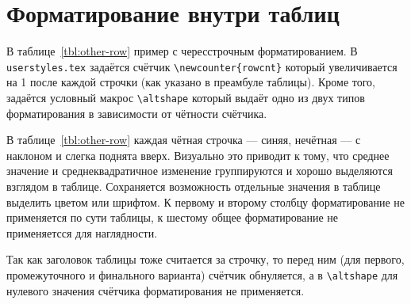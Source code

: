 \section{Форматирование внутри таблиц} \label{AppendixB3}

В таблице~\ref{tbl:other-row} пример с чересстрочным
форматированием. В \verb+userstyles.tex+  задаётся счётчик
\verb+\newcounter{rowcnt}+ который увеличивается на 1 после каждой
строчки (как указано в преамбуле таблицы). Кроме того, задаётся
условный макрос \verb+\altshape+ который выдаёт одно из
двух типов форматирования в зависимости от чётности счётчика. 

В таблице~\ref{tbl:other-row} каждая чётная строчка --- синяя,
нечётная --- с наклоном и слегка поднята вверх. Визуально это приводит
к тому, что среднее значение и среднеквадратичное изменение
группируются и хорошо выделяются взглядом в таблице. Сохраняется
возможность отдельные значения в таблице выделить цветом или
шрифтом. К первому и второму столбцу форматирование не применяется по
сути таблицы, к шестому общее форматирование не применяетсся для
наглядности.

Так как заголовок таблицы тоже считается за строчку, то перед ним (для
первого, промежуточного и финального варианта) счётчик обнуляется, а в
\verb+\altshape+ для нулевого значения счётчика форматирования не
применяется. 


